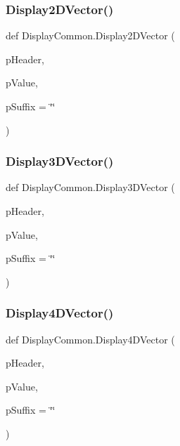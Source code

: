 \subsubsection{\texorpdfstring{Display2\+D\+Vector()}{Display2DVector()}}
{\footnotesize\ttfamily def Display\+Common.\+Display2\+D\+Vector (\begin{DoxyParamCaption}\item[{}]{p\+Header,  }\item[{}]{p\+Value,  }\item[{}]{p\+Suffix = {\ttfamily \char`\"{}\char`\"{}} }\end{DoxyParamCaption})}

\mbox{\label{namespace_display_common_af97c41fa4dea77cbe28d38f172849f5f}} 
\subsubsection{\texorpdfstring{Display3\+D\+Vector()}{Display3DVector()}}
{\footnotesize\ttfamily def Display\+Common.\+Display3\+D\+Vector (\begin{DoxyParamCaption}\item[{}]{p\+Header,  }\item[{}]{p\+Value,  }\item[{}]{p\+Suffix = {\ttfamily \char`\"{}\char`\"{}} }\end{DoxyParamCaption})}

\mbox{\label{namespace_display_common_ac10285d2dff6dd7fc62f6575316b0e4d}} 
\subsubsection{\texorpdfstring{Display4\+D\+Vector()}{Display4DVector()}}
{\footnotesize\ttfamily def Display\+Common.\+Display4\+D\+Vector (\begin{DoxyParamCaption}\item[{}]{p\+Header,  }\item[{}]{p\+Value,  }\item[{}]{p\+Suffix = {\ttfamily \char`\"{}\char`\"{}} }\end{DoxyParamCaption})}

